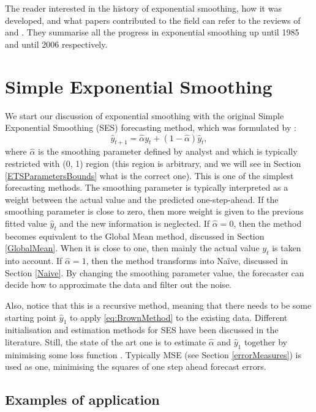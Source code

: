 \documentclass[
]{book}
\theoremstyle{definition}
\theoremstyle{definition}
\theoremstyle{definition}
\theoremstyle{definition}
\theoremstyle{remark}
\begin{document}
The reader interested in the history of exponential smoothing, how it was developed, and what papers contributed to the field can refer to the reviews of \citet{Gardner1985} and \citet{Gardner2006}. They summarise all the progress in exponential smoothing up until 1985 and until 2006 respectively.

\hypertarget{SES}{%
\section{Simple Exponential Smoothing}\label{SES}}

We start our discussion of exponential smoothing with the original Simple Exponential Smoothing (SES) forecasting method, which was formulated by \citep{Brown1956}:
\begin{equation}
  \hat{y}_{t+1} = \hat{\alpha} {y}_{t} + (1 -\hat{\alpha}) \hat{y}_{t},
  \label{eq:BrownMethod}
\end{equation}
where \(\hat{\alpha}\) is the smoothing parameter defined by analyst and which is typically restricted with (0, 1) region (this region is arbitrary, and we will see in Section \ref{ETSParametersBounds} what is the correct one). This is one of the simplest forecasting methods. The smoothing parameter is typically interpreted as a weight between the actual value and the predicted one-step-ahead. If the smoothing parameter is close to zero, then more weight is given to the previous fitted value \(\hat{y}_{t}\) and the new information is neglected. If \(\hat{\alpha}=0\), then the method becomes equivalent to the Global Mean method, discussed in Section \ref{GlobalMean}. When it is close to one, then mainly the actual value \({y}_{t}\) is taken into account. If \(\hat{\alpha}=1\), then the method transforms into Naïve, discussed in Section \ref{Naive}. By changing the smoothing parameter value, the forecaster can decide how to approximate the data and filter out the noise.

Also, notice that this is a recursive method, meaning that there needs to be some starting point \(\hat{y}_1\) to apply \eqref{eq:BrownMethod} to the existing data. Different initialisation and estimation methods for SES have been discussed in the literature. Still, the state of the art one is to estimate \(\hat{\alpha}\) and \(\hat{y}_{1}\) together by minimising some loss function \citep{Hyndman2002}. Typically MSE (see Section \ref{errorMeasures}) is used as one, minimising the squares of one step ahead forecast errors.

\hypertarget{examples-of-application}{%
\subsection{Examples of application}\label{examples-of-application}}
\end{document}
